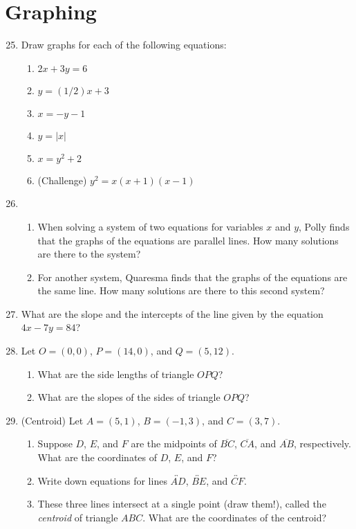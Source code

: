 \documentclass{article}
\begin{document}
\newpage
\section{Graphing}

\begin{enumerate}
\setcounter{enumi}{24}
\item Draw graphs for each of the following equations:
\begin{enumerate}
\item $2x + 3y = 6$
\item $y = (1/2)x + 3$
\item $x = -y - 1$
\item $y = \lvert x\rvert$
\item $x = y^2 + 2$
\item (Challenge) $y^2 = x(x + 1)(x - 1)$
\end{enumerate}
\item \begin{enumerate}
\item When solving a system of two equations for variables $x$ and $y$, Polly finds that the graphs of the equations are parallel lines. How many solutions are there to the system?
\item For another system, Quaresma finds that the graphs of the equations are the same line. How many solutions are there to this second system?
\end{enumerate}
\item What are the slope and the intercepts of the line given by the equation $4x - 7y = 84$?
\item Let $O = (0,0)$, $P = (14,0)$, and $Q = (5,12)$.
\begin{enumerate}
\item What are the side lengths of triangle $OPQ$?
\item What are the slopes of the sides of triangle $OPQ$?
\end{enumerate}
\item (Centroid) Let $A = (5,1)$, $B = (-1,3)$, and $C = (3,7)$.
\begin{enumerate}
\item Suppose $D$, $E$, and $F$ are the midpoints of $\overline{BC}$, $\overline{CA}$, and $\overline{AB}$, respectively. What are the coordinates of $D$, $E$, and $F$?
\item Write down equations for lines $\overleftrightarrow{AD}$, $\overleftrightarrow{BE}$, and $\overleftrightarrow{CF}$.
\item These three lines intersect at a single point (draw them!), called the \emph{centroid} of triangle $ABC$. What are the coordinates of the centroid?

\end{enumerate}
\end{enumerate}
\end{document}
